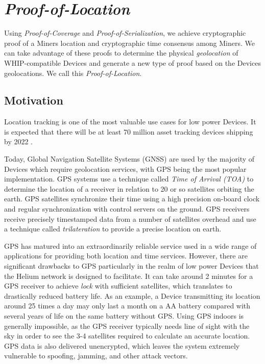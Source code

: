 \documentclass[10pt, nonatbib, nocopyrightspace, reprint]{sigplanconf}
\begin{document}
\section{\emph{Proof-of-Location}} \label{geolocation}

Using \emph{Proof-of-Coverage} and \emph{Proof-of-Serialization}, we achieve cryptographic proof of a Miners location and cryptographic time consensus among Miners. We can take advantage of these proofs to determine the physical \emph{geolocation} of WHIP-compatible Devices and generate a new type of proof based on the Devices geolocations. We call this \emph{Proof-of-Location}.

\subsection{Motivation}

Location tracking is one of the most valuable use cases for low power Devices. It is expected that there will be at least 70 million asset tracking devices shipping by 2022 \cite{mobile-experts}.

Today, Global Navigation Satellite Systems (GNSS) are used by the majority of Devices which require geolocation services, with GPS being the most popular implementation. GPS systems use a technique called \emph{Time of Arrival (TOA)} to determine the location of a receiver in relation to 20 or so satellites orbiting the earth. GPS satellites synchronize their time using a high precision on-board clock and regular synchronization with control servers on the ground. GPS receivers receive precisely timestamped data from a number of satellites overhead and use a technique called \emph{trilateration} to provide a precise location on earth.

GPS has matured into an extraordinarily reliable service used in a wide range of applications for providing both location and time services. However, there are significant drawbacks to GPS particularly in the realm of low power Devices that the Helium network is designed to facilitate. It can take around 2 minutes for a GPS receiver to achieve \emph{lock} with sufficient satellites, which translates to drastically reduced battery life. As an example, a Device transmitting its location around 25 times a day may only last a month on a AA battery compared with several years of life on the same battery without GPS. Using GPS indoors is generally impossible, as the GPS receiver typically needs line of sight with the sky in order to see the 3-4 satellites required to calculate an accurate location. GPS data is also delivered unencrypted, which leaves the system extremely vulnerable to spoofing, jamming, and other attack vectors.
\end{document}
